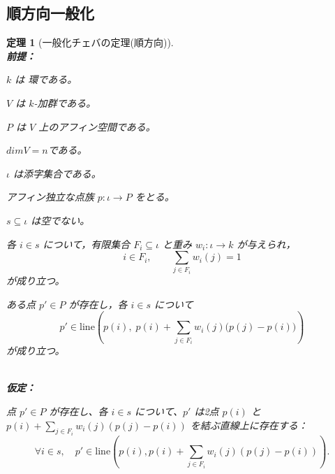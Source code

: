 \documentclass[a4paper,12pt]{bxjsbook}
\theoremstyle{theorem}
\newtheorem{theorem}{定理}[chapter]
\begin{document}
    \subsection{順方向一般化}
    \begin{theorem}[一般化チェバの定理(順方向)]
        \noindent\textbf{\\前提：}\par
        \begin{theoremenumerate}[label=(A\arabic*), leftmargin=4em, topsep=2pt, partopsep=0pt, itemsep=0pt, parsep=0pt]
            \item $k$ は 環である。
            \item $V$ は $k$-加群である。
            \item $P$ は $V$ 上のアフィン空間である。
            \item $dimV = n$である。
            \item $\iota$ は添字集合である。
            \item アフィン独立な点族 $p : \iota \to P$ をとる。
            \item $s \subseteq \iota$ は空でない。
            \item 各 $i\in s$ について，有限集合 $F_i\subseteq \iota$ と重み $w_i:\iota\to k$ が与えられ，
            \[
                i\in F_i,\qquad \sum_{j\in F_i} w_i(j)=1
            \]
            が成り立つ。
            \item ある点 $p'\in P$ が存在し，各 $i\in s$ について
            \[
                p' \in \mathrm{line}\!\left(
                p(i),\;
                p(i)+\sum_{j\in F_i} w_i(j)\bigl(p(j)-p(i)\bigr)
                \right)
            \]
            が成り立つ。
        \end{theoremenumerate}
        \noindent\textbf{\\仮定：}\par
        \begin{theoremenumerate}[label=(A\arabic*), leftmargin=4em, topsep=2pt, partopsep=0pt, itemsep=0pt, parsep=0pt]
            \item 点 $p' \in P$ が存在し、各 $i \in s$ について、$p'$ は2点 $p(i)$ と $p(i) + \sum_{j \in F_i} w_i(j)(p(j) - p(i))$ を結ぶ直線上に存在する：
            \[
                \forall i \in s, \quad p' \in \mathrm{line}\left(p(i), p(i) + \sum_{j \in F_i} w_i(j)(p(j) - p(i))\right).
            \]
        \end{theoremenumerate}


\end{theorem}
\end{document}
